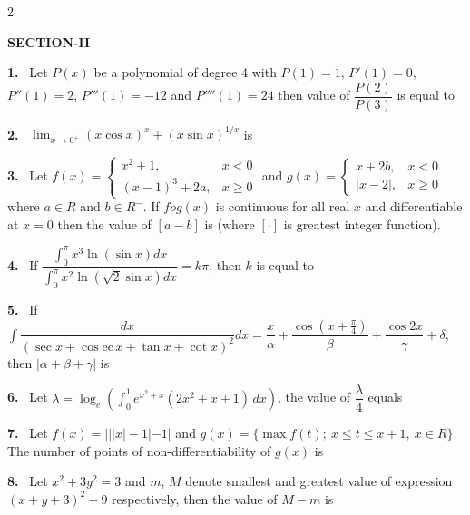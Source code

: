 \documentclass[10pt]{extarticle}
\newcommand{\sect}[1]{\par\smallskip\noindent\textbf{#1}\par}
\newcommand{\qn}[1]{\par\smallskip\noindent\textbf{#1.}~}
\newenvironment{qoptions}{\begin{itemize}[leftmargin=1.8em,itemsep=1pt,topsep=2pt,label={}]}{\end{itemize}}
\begin{document}
\begin{multicols}{2}
\begin{qoptions}
\end{qoptions}
\sect{SECTION-II}
\qn{1} Let $P(x)$ be a polynomial of degree 4 with $P(1)=1$, $P'(1)=0$, $P''(1)=2$, $P'''(1)=-12$ and $P''''(1)=24$ then value of $\dfrac{P(2)}{P(3)}$ is equal to
\qn{2} $\displaystyle\lim_{x\to0^+}(x\cos x)^x+(x\sin x)^{1/x}$ is
\qn{3} Let $f(x)=\begin{cases}x^2+1, & x<0\\ (x-1)^3+2a, & x\ge0\end{cases}$ and $g(x)=\begin{cases}x+2b, & x<0\\ |x-2|, & x\ge0\end{cases}$ where $a\in R$ and $b\in R^-$. If $fog(x)$ is continuous for all real $x$ and differentiable at $x=0$ then the value of $[a-b]$ is (where $[\cdot]$ is greatest integer function).
\qn{4} If $\dfrac{\displaystyle\int_0^\pi x^3\ln(\sin x)dx}{\displaystyle\int_0^\pi x^2\ln\left(\sqrt2\sin x\right)dx}=k\pi$, then $k$ is equal to
\qn{5} If $\displaystyle\int\dfrac{dx}{(\sec x+\cos\mathrm{ec}\,x+\tan x+\cot x)^2}dx=\dfrac x\alpha+\dfrac{\cos\left(x+\frac\pi4\right)}\beta+\dfrac{\cos2x}\gamma+\delta$, then $|\alpha+\beta+\gamma|$ is
\qn{6} Let $\lambda=\log_e\left(\displaystyle\int_0^1e^{x^2+x}(2x^2+x+1)\,dx\right)$, the value of $\dfrac\lambda4$ equals
\qn{7} Let $f(x)=|||x|-1|-1|$ and $g(x)=\{\max f(t);\ x\le t\le x+1,\ x\in R\}$. The number of points of non-differentiability of $g(x)$ is
\qn{8} Let $x^2+3y^2=3$ and $m$, $M$ denote smallest and greatest value of expression $(x+y+3)^2-9$ respectively, then the value of $M-m$ is
\end{multicols}
\end{document}
